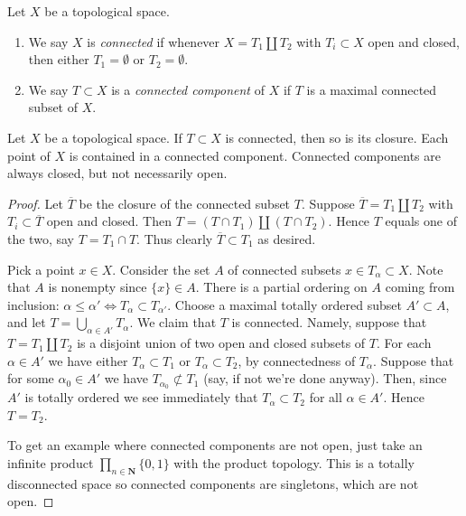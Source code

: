 \begin{definition}
\label{definition-connected-components}
Let $X$ be a topological space.
\begin{enumerate}
\item We say $X$ is {\it connected} if whenever $X = T_1 \coprod T_2$
with $T_i \subset X$ open and closed, then either $T_1 = \emptyset$ or
$T_2 = \emptyset$.
\item We say $T \subset X$ is a {\it connected component} of $X$ if
$T$ is a maximal connected subset of $X$. 
\end{enumerate}
\end{definition}

\begin{lemma}
\label{lemma-connected-components}
Let $X$ be a topological space. If $T \subset X$ is connected,
then so is its closure. Each point of $X$ is contained
in a connected component. Connected components are always closed,
but not necessarily open.
\end{lemma}

\begin{proof}
Let $\overline{T}$ be the closure of the connected subset $T$.
Suppose $\overline{T} = T_1 \coprod T_2$ with $T_i \subset \overline{T}$
open and closed. Then $T = (T\cap T_1) \coprod (T \cap T_2)$. Hence 
$T$ equals one of the two, say $T = T_1 \cap T$. Thus clearly
$\overline{T} \subset T_1$ as desired.

\medskip\noindent
Pick a point $x\in X$. Consider the set $A$ of connected subsets
$x \in T_\alpha \subset X$. Note that $A$ is nonempty since
$\{x\} \in A$. There is a partial ordering on $A$ coming from
inclusion: $\alpha \leq \alpha' \Leftrightarrow T_\alpha \subset T_{\alpha'}$.
Choose a maximal totally ordered subset $A' \subset A$, and let
$T = \bigcup_{\alpha \in A'} T_\alpha$. We claim that $T$ is 
connected. Namely, suppose that $T =  T_1 \coprod T_2$ is a disjoint
union of two open and closed subsets of $T$.
For each $\alpha \in A'$ we have either $T_\alpha \subset T_1$
or $T_\alpha \subset T_2$, by connectedness of $T_\alpha$.
Suppose that for some $\alpha_0 \in A'$ we have
$T_{\alpha_0} \not\subset T_1$ (say, if not we're done anyway).
Then, since $A'$ is totally ordered we see immediately that
$T_\alpha \subset T_2$ for all $\alpha \in A'$. Hence $T = T_2$. 

\medskip\noindent
To get an example
where connected components are not open, just take 
an infinite product $\prod_{n \in \mathbf{N}} \{0,1\}$
with the product topology. This is a totally disconnected
space so connected components are singletons, which are
not open.
\end{proof}


